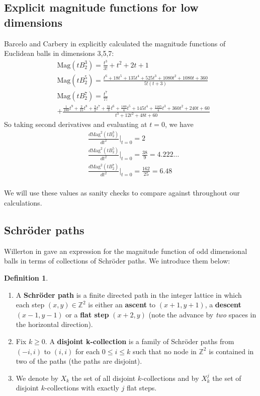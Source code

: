 \documentclass[11pt]{article}
\newcommand{\Z}{\mathbb{Z}}
\theoremstyle{definition}
\newtheorem*{defn}{Definition}
\theoremstyle{definition}
\theoremstyle{plain}
\theoremstyle{plain}
\theoremstyle{plain}
\theoremstyle{definition}
\begin{document}
\subsection*{Explicit magnitude functions for low dimensions}
Barcelo and Carbery in \cite{barcelo_magnitudes_2016} explicitly calculated the magnitude functions of Euclidean balls in dimensions 3,5,7:
\begin{align*}
&\text{Mag}(tB_2^3) = \frac{t^3}{3!}+t^2+2t+1 \\
&\text{Mag}(tB_2^5) = \frac{t^6+18t^5+135t^4+525t^3+1080t^2+1080t+360}{5!(t+3)} \\
&\text{Mag}(tB_2^7) = \frac{t^7}{7!} \\
&+ \frac{\frac{1}{180}t^9+\frac{2}{15}t^8+\frac{3}{2}t^7+\frac{31}{3}t^6+\frac{189}{4}t^5+145t^4+\frac{1165}{4}t^3+360t^2+240t+60}{t^3+12t^2+48t+60}
\end{align*}
So taking second derivatives and evaluating at $t = 0$, we have
\begin{align*}
&\frac{d\text{Mag}^2(tB_2^3)}{dt^2}\big\vert_{t=0} = 2 \\
&\frac{d\text{Mag}^2(tB_2^5)}{dt^2}\big\vert_{t=0} = \frac{38}{9} = 4.222\dots \\
&\frac{d\text{Mag}^2(tB_2^7)}{dt^2}\big\vert_{t=0} = \frac{162}{25} = 6.48 \\
\end{align*}

We will use these values as sanity checks to compare against throughout our calculations.

\subsection*{Schröder paths}
Willerton in \cite{willerton_magnitude_2017} gave an expression for the magnitude function of odd dimensional balls in terms of collections of Schröder paths. We introduce them below:
\begin{defn}
\begin{enumerate}[label=$\bullet$]
\item A \textbf{Schröder path} is a finite directed path in the integer lattice in which each step $(x,y)\in\Z^2$ is either an \textbf{ascent} to $(x+1,y+1)$, a \textbf{descent} $(x-1,y-1)$ or a \textbf{flat step} $(x+2,y)$ (note the advance by \emph{two} spaces in the horizontal direction).
\item Fix $k\geq0$. A \textbf{disjoint k-collection} is a family of Schröder paths from $(-i,i)$ to $(i,i)$ for each $0\leq i\leq k$ such that no node in $\Z^2$ is contained in two of the paths (the paths are disjoint).
\item We denote by $X_k$ the set of all disjoint $k$-collections and by $X_k^j$ the set of disjoint $k$-collections with exactly $j$ flat steps.
\end{enumerate}
\end{defn}
\end{document}
